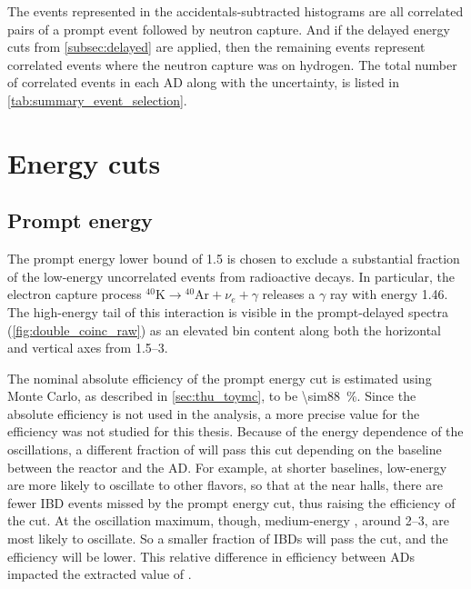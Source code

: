 The events represented in the accidentals-subtracted histograms
are all correlated pairs
of a prompt event followed by neutron capture.
And if the delayed energy cuts from \cref{subsec:delayed} are applied,
then the remaining events represent correlated events
where the neutron capture was on hydrogen.
The total number of correlated events in each AD
along with the uncertainty, is listed in \cref{tab:summary_event_selection}.

\section{Energy cuts}
\label{sec:energy_cuts}

\subsection{Prompt energy}
\label{subsec:prompt_energy}
The prompt energy lower bound of \SI{1.5}{\mev}
is chosen to exclude a substantial fraction
of the low-energy uncorrelated events from radioactive decays.
In particular, the electron capture process
${}^{40}\text{K} \to {}^{40}\text{Ar} + \nu_e + \gamma$
releases a $\gamma$ ray with energy \SI{1.46}{\mev}.
The high-energy tail of this interaction is visible in the prompt-delayed spectra
(\cref{fig:double_coinc_raw}) as an elevated bin content
along both the horizontal and vertical axes from \SIrange{1.5}{3}{\mev}.

The nominal absolute efficiency of the prompt energy cut is estimated using Monte Carlo,
as described in \cref{sec:thu_toymc}, to be \SI{\sim88}{\percent}.
Since the absolute efficiency is not used in the \thetaot{} analysis,
a more precise value for the efficiency was not studied for this thesis.
Because of the energy dependence of the \nuebar{} oscillations,
a different fraction of \nuebar{} will pass this cut
depending on the baseline between the reactor and the AD.
For example, at shorter baselines, low-energy \nuebar{}
are more likely to oscillate to other flavors, so that at the near halls,
there are fewer IBD events missed by the prompt energy cut,
thus raising the efficiency of the cut.
At the oscillation maximum, though, medium-energy \nuebar{},
around \SIrange{2}{3}{\mev}, are most likely to oscillate.
So a smaller fraction of IBDs will pass the cut,
and the efficiency will be lower.
This relative difference in efficiency between ADs
impacted the extracted value of \thetaot{}.

